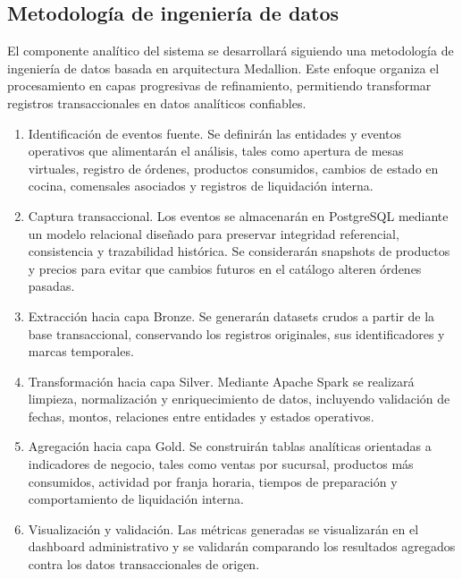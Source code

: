 \subsection{Metodología de ingeniería de datos}

El componente analítico del sistema se desarrollará siguiendo una metodología de ingeniería
de datos basada en arquitectura Medallion. Este enfoque organiza el procesamiento en capas
progresivas de refinamiento, permitiendo transformar registros transaccionales en datos
analíticos confiables.

\begin{enumerate}[leftmargin=1.5em]
  \item Identificación de eventos fuente.
  Se definirán las entidades y eventos operativos que alimentarán el análisis, tales como
  apertura de mesas virtuales, registro de órdenes, productos consumidos, cambios de estado
  en cocina, comensales asociados y registros de liquidación interna.

  \item Captura transaccional.
  Los eventos se almacenarán en PostgreSQL mediante un modelo relacional diseñado para
  preservar integridad referencial, consistencia y trazabilidad histórica. Se considerarán
  snapshots de productos y precios para evitar que cambios futuros en el catálogo alteren
  órdenes pasadas.

  \item Extracción hacia capa Bronze.
  Se generarán datasets crudos a partir de la base transaccional, conservando los registros
  originales, sus identificadores y marcas temporales.

  \item Transformación hacia capa Silver.
  Mediante Apache Spark se realizará limpieza, normalización y enriquecimiento de datos,
  incluyendo validación de fechas, montos, relaciones entre entidades y estados operativos.

  \item Agregación hacia capa Gold.
  Se construirán tablas analíticas orientadas a indicadores de negocio, tales como ventas
  por sucursal, productos más consumidos, actividad por franja horaria, tiempos de preparación
  y comportamiento de liquidación interna.

  \item Visualización y validación.
  Las métricas generadas se visualizarán en el dashboard administrativo y se validarán
  comparando los resultados agregados contra los datos transaccionales de origen.
\end{enumerate}

